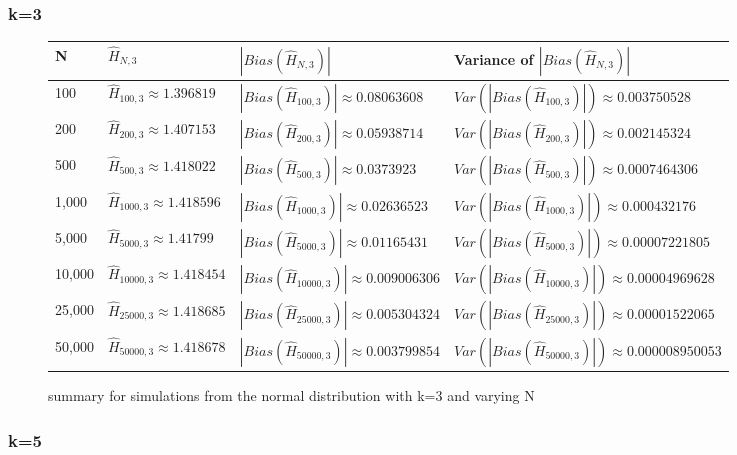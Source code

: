 \documentclass{article}
\begin{document}
\subsubsection{k=3}



\begin{figure} 
 \begin{adjustwidth}{-2cm}{}
\begin{tabular}{|l|l|l|l|}
\hline
N & $\hat{H}_{N, 3}$ & $|Bias(\hat{H}_{N, 3})|$ & Variance of $|Bias(\hat{H}_{N, 3})|$ \\
\hline
100 & $\hat{H}_{100, 3} \approx 1.396819$ & $|Bias(\hat{H}_{100, 3})| \approx 0.08063608$ & $Var(|Bias(\hat{H}_{100, 3})|) \approx 0.003750528$\\
200 & $\hat{H}_{200, 3} \approx 1.407153$ & $|Bias(\hat{H}_{200, 3})| \approx 0.05938714$ & $Var(|Bias(\hat{H}_{200, 3})|) \approx 0.002145324$\\
500 & $\hat{H}_{500, 3} \approx 1.418022$ & $|Bias(\hat{H}_{500, 3})| \approx 0.0373923$ & $Var(|Bias(\hat{H}_{500, 3})|) \approx 0.0007464306$\\
1,000 & $\hat{H}_{1000, 3} \approx 1.418596$ & $|Bias(\hat{H}_{1000, 3})| \approx 0.02636523$ & $Var(|Bias(\hat{H}_{1000, 3})|) \approx 0.000432176$\\
5,000 & $\hat{H}_{5000, 3} \approx 1.41799$ & $|Bias(\hat{H}_{5000, 3})| \approx 0.01165431$ & $Var(|Bias(\hat{H}_{5000, 3})|) \approx 0.00007221805$\\
10,000 & $\hat{H}_{10000, 3} \approx 1.418454$ & $|Bias(\hat{H}_{10000, 3})| \approx 0.009006306$ & $Var(|Bias(\hat{H}_{10000, 3})|) \approx 0.00004969628$\\
25,000 & $\hat{H}_{25000, 3} \approx 1.418685$ & $|Bias(\hat{H}_{25000, 3})| \approx 0.005304324$ & $Var(|Bias(\hat{H}_{25000, 3})|) \approx 0.00001522065$\\
50,000 & $\hat{H}_{50000, 3} \approx 1.418678$ & $|Bias(\hat{H}_{50000, 3})| \approx 0.003799854$ & $Var(|Bias(\hat{H}_{50000, 3})|) \approx 0.000008950053$\\
\hline
\end{tabular}
\caption{\label{fig:normal_k=3} summary for simulations from the normal distribution with k=3 and varying N}
 \end{adjustwidth}
\end{figure}


\subsubsection{k=5}
\end{document}
